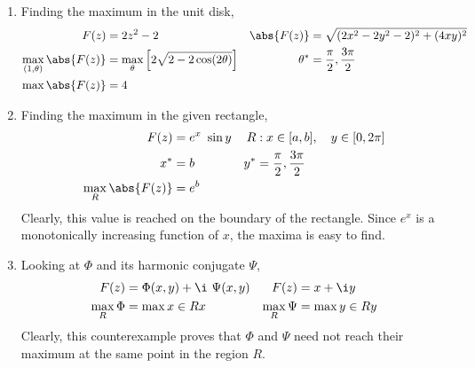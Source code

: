 \begin{enumerate}
    \item Finding the maximum in the unit disk,
          \begin{align}
              F(z)                        & = 2z^2 - 2                             &
              \abs{F(z)}                  & = \sqrt{(2x^2 - 2y^2 - 2)^2 + (4xy)^2}   \\
              \max_{(1,\theta)}\abs{F(z)} & = \max_\theta{\Big[2\sqrt{2 -
              2\cos(2\theta)}\Big]}       &
              \theta^*                    & = \frac{\pi}{2}, \frac{3\pi}{2}          \\
              \max{\abs{F(z)}}            & = 4
          \end{align}

    \item Finding the maximum in the given rectangle,
          \begin{align}
              F(z)               & = e^x\ \sin y                        &
              R                  & : x \in [a,b], \quad y \in [0, 2\pi]   \\
              x^*                & = b                                  &
              y^*                & = \frac{\pi}{2}, \frac{3\pi}{2}        \\
              \max_{R}\abs{F(z)} & = e^b
          \end{align}
          Clearly, this value is reached on the boundary of the rectangle. Since $ e^x $
          is a monotonically increasing function of $ x $, the maxima is easy to find.

    \item Looking at $ \Phi $ and its harmonic conjugate $ \Psi $,
          \begin{align}
              F(z)         & = \Phi(x, y) + \i\ \Psi(x, y) &
              F(z)         & = x + \i y                      \\
              \max_R{\Phi} & = \max{x \in R} x             &
              \max_R{\Psi} & = \max{y \in R} y
          \end{align}
          Clearly, this counterexample proves that $ \Phi $ and $ \Psi $ need not reach
          their maximum at the same point in the region $ R $.


\end{enumerate}
